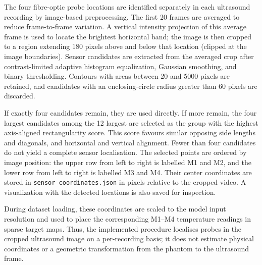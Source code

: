 The four fibre-optic probe locations are identified separately in each
ultrasound recording by image-based preprocessing. The first 20 frames are
averaged to reduce frame-to-frame variation. A vertical intensity projection
of this average frame is used to locate the brightest horizontal band; the
image is then cropped to a region extending 180 pixels above and below that
location (clipped at the image boundaries). Sensor candidates are extracted
from the averaged crop after contrast-limited adaptive histogram
equalization, Gaussian smoothing, and binary thresholding. Contours with
areas between 20 and 5000 pixels are retained, and candidates with an
enclosing-circle radius greater than 60 pixels are discarded.

If exactly four candidates remain, they are used directly. If more remain,
the four largest candidates among the 12 largest are selected as the group
with the highest axis-aligned rectangularity score. This score favours
similar opposing side lengths and diagonals, and horizontal and vertical
alignment. Fewer than four candidates do not yield a complete sensor
localisation. The selected points are ordered by image position: the upper
row from left to right is labelled M1 and M2, and the lower row from left to
right is labelled M3 and M4. Their center coordinates are stored in
\texttt{sensor\_coordinates.json} in pixels relative to the cropped video. A
visualization with the detected locations is also saved for inspection.

During dataset loading, these coordinates are scaled to the model input
resolution and used to place the corresponding M1--M4 temperature readings
in sparse target maps. Thus, the implemented procedure localises probes in
the cropped ultrasound image on a per-recording basis; it does not estimate
physical coordinates or a geometric transformation from the phantom to the
ultrasound frame.
